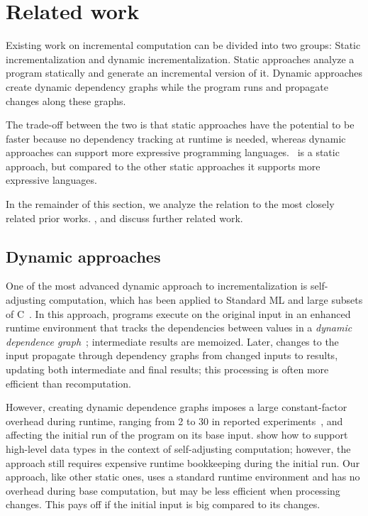 \section{Related work}
\label{sec:rw}

Existing work on incremental computation can be divided into two
groups: Static incrementalization and dynamic incrementalization.
Static approaches analyze a program statically and generate an incremental
version of it. Dynamic approaches create dynamic dependency graphs while
the program runs and propagate changes along these graphs.

The trade-off between the two is that static approaches have the potential
to be faster because no dependency tracking at runtime is needed, whereas
dynamic approaches can support more expressive programming languages.
%
\ILC\ is a static approach, but compared to the other static
approaches it supports more expressive languages.

In the remainder of this section, we analyze the relation to the
most closely related prior works. , \citet{Gupta99MMV}
and \citet{Acar06} discuss further related work.


\subsection{Dynamic approaches}
One of the most advanced dynamic approach to incrementalization is
self-adjusting computation, which has been applied to Standard ML
and large subsets of C~\citep{Acar09,Hammer11}.
In this approach, programs execute on the original
input in an enhanced runtime environment that tracks the
dependencies between values in a \emph{dynamic
  dependence graph}~\citep{Acar06}; intermediate results are
memoized.
Later, changes to the input propagate through
dependency graphs from changed inputs to results,
updating both intermediate and final results;
this processing is often more efficient than recomputation.

However, creating dynamic
dependence graphs imposes a large constant-factor overhead during
runtime, ranging from 2 to 30 in reported
experiments~\citep{Acar09EAS,Acar10TDT}, and affecting the
initial run of the program on its base input.
\citet{Acar10TDT} show how to support high-level data
types in the context of self-adjusting computation; however, the
approach still requires expensive runtime bookkeeping during the initial run.
Our approach, like other static ones, uses a standard runtime
environment and has no overhead
during base computation, but may be less efficient when processing
changes. This pays off if the initial input is 
big compared to its changes.


